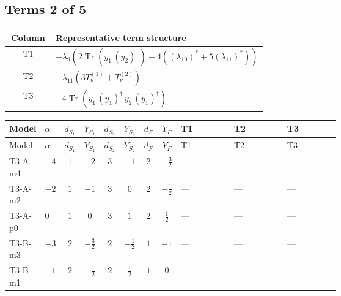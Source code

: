 \documentclass[8pt]{article}
\begin{document}
\begin{landscape}
\subsection*{Terms 2 of 5}
\begin{center}
\begin{tabular}{@{}c >{\raggedright\arraybackslash}p{0.82\linewidth}@{}}
\toprule
Column & Representative term structure \\
\midrule
T1 & \(\displaystyle +{\lambda_{9}} (2 \operatorname{Tr}\!\left({y_1}\,\left({y_2}\right)^{\dagger}\right)+4 (\left({\lambda_{10}}\right)^{*}+5 \left({\lambda_{11}}\right)^{*}))\) \\
\midrule
T2 & \(\displaystyle +{\lambda_{11}} (3 T_{\nu}^{(1)}+T_{\nu}^{(2)})\) \\
\midrule
T3 & \(\displaystyle -4 \operatorname{Tr}\!\left({y_1}\,\left({y_1}\right)^{\dagger}\,{y_2}\,\left({y_1}\right)^{\dagger}\right)\) \\
\midrule
\bottomrule
\end{tabular}
\end{center}
\smallskip
\tiny
\begin{longtable}{@{}llcccccc >{\raggedright\arraybackslash}p{0.21\linewidth} >{\raggedright\arraybackslash}p{0.21\linewidth} >{\raggedright\arraybackslash}p{0.21\linewidth}@{}}
\toprule
Model & $\alpha$ & $d_{S_1}$ & $Y_{S_1}$ & $d_{S_2}$ & $Y_{S_2}$ & $d_F$ & $Y_F$ & T1 & T2 & T3 \\
\midrule
\endfirsthead
\toprule
Model & $\alpha$ & $d_{S_1}$ & $Y_{S_1}$ & $d_{S_2}$ & $Y_{S_2}$ & $d_F$ & $Y_F$ & T1 & T2 & T3 \\
\midrule
\endhead
T3-A-m4 & $-4$ & $1$ & $-2$ & $3$ & $-1$ & $2$ & $-\frac{3}{2}$ & --- & --- & --- \\
\midrule
T3-A-m2 & $-2$ & $1$ & $-1$ & $3$ & $0$ & $2$ & $-\frac{1}{2}$ & --- & --- & --- \\
\midrule
T3-A-p0 & $0$ & $1$ & $0$ & $3$ & $1$ & $2$ & $\frac{1}{2}$ & --- & --- & --- \\
\midrule
T3-B-m3 & $-3$ & $2$ & $-\frac{3}{2}$ & $2$ & $-\frac{1}{2}$ & $1$ & $-1$ & --- & --- & --- \\
\midrule
T3-B-m1 & $-1$ & $2$ & $-\frac{1}{2}$ & $2$ & $\frac{1}{2}$ & $1$ & $0$ & \scriptsize\adjustbox{max width=\linewidth}{$\begin{gathered} +{\lambda_{9}} (2 \operatorname{Tr}\!\left({y_1}\,\left({y_2}\right)^{\dagger}\right)+4 (\left({\lambda_{10}}\right)^{*}+5 \left({\lambda_{11}}\right)^{*}))\end{gathered}$} & \scriptsize\adjustbox{max width=\linewidth}{$\begin{gathered} +{\lambda_{11}} (3 T_{\nu}^{(1)}+T_{\nu}^{(2)})\end{gathered}$} & \scriptsize\adjustbox{max width=\linewidth}{$\begin{gathered} -4 \operatorname{Tr}\!\left({y_1}\,\left({y_1}\right)^{\dagger}\,{y_2}\,\left({y_1}\right)^{\dagger}\right)\end{gathered}$} \\

\end{longtable}
\end{landscape}
\end{document}
